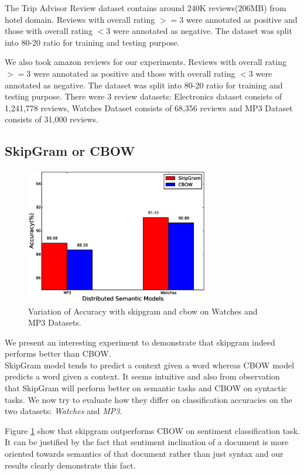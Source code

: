 \documentclass[11pt,a4paper]{article}
\begin{document}
The Trip Advisor Review dataset contains around 240K reviews(206MB) from hotel domain. Reviews with overall rating $>=$3 were annotated as positive and those with overall rating $<$3 were annotated as negative. The dataset was split into 80-20 ratio for training and testing purpose.

We also took amazon reviews for our experiments. Reviews with overall rating $>=$3 were annotated as positive and those with overall rating $<$3 were annotated as negative. The dataset was split into 80-20 ratio for training and testing purpose. There were 3 review datasets: Electronics dataset consists of 1,241,778 reviews, Watches Dataset consists of 68,356 reviews and MP3 Dataset consists of 31,000 reviews.

\subsection{SkipGram or CBOW}
\begin{figure}[h]
\centering
\includegraphics[width=80mm, height=60mm]{img/accuracy_sgcbow.eps}
\caption{Variation of Accuracy with skipgram and cbow on Watches and MP3 Datasets. \label{fig:accuracy_sgcbow}}
\end{figure}
We present an interesting experiment to demonstrate that skipgram indeed performs better than CBOW.\\
SkipGram model tends to predict a context given a word whereas CBOW model predicts a word given a context. It seems intuitive and also from observation~\cite{Mikolov:13b} that SkipGram will perform better on semantic tasks and CBOW on syntactic tasks. We now try to evaluate how they differ on classification accuracies on the two datasets: \emph{Watches} and \emph{MP3}.


Figure \ref{fig:accuracy_sgcbow} show that skipgram outperforms CBOW on sentiment classification task. It can be justified by the fact that sentiment inclination of a document is more oriented towards semantics of that document rather than just syntax and our results clearly demonstrate this fact.
\end{document}
